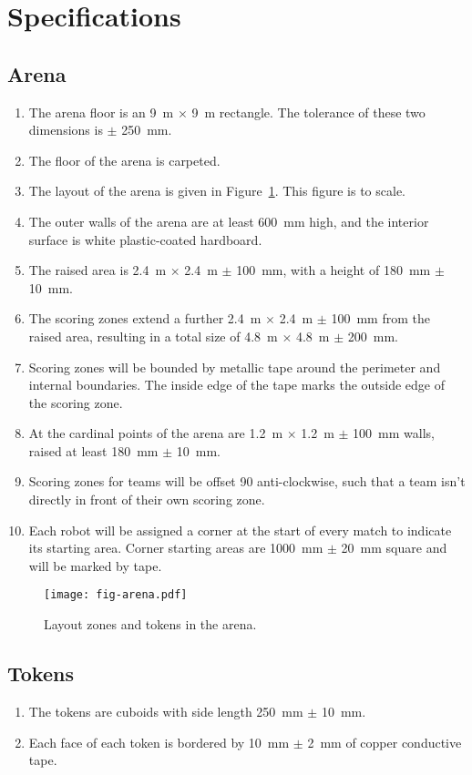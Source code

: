 \section{Specifications}
\label{sec:specs}

\subsection{Arena}
\label{spec:arena}

\begin{enumerate}
  \item The arena floor is an \SI{9}{m} $\times$ \SI{9}{m} rectangle. The
        tolerance of these two dimensions is $\pm$ \SI{250}{mm}.
  \item The floor of the arena is carpeted.
  \item The layout of the arena is given in Figure~\ref{fig:arena}. This
        figure is to scale.
  \item The outer walls of the arena are at least \SI{600}{mm} high, and the
        interior surface is white plastic-coated hardboard.
  \item The raised area is \SI{2.4}{m} $\times$ \SI{2.4}{m} $\pm$ \SI{100}{mm},
        with a height of \SI{180}{mm} $\pm$ \SI{10}{mm}.
  \item The scoring zones extend a further \SI{2.4}{m} $\times$ \SI{2.4}{m} $\pm$ \SI{100}{mm}
        from the raised area, resulting in a total size of \SI{4.8}{m} $\times$ \SI{4.8}{m} $\pm$ \SI{200}{mm}.
  \item Scoring zones will be bounded by metallic tape around the perimeter
        and internal boundaries. The inside edge of the tape marks the outside
        edge of the scoring zone.
  \item At the cardinal points of the arena are \SI{1.2}{m} $\times$ \SI{1.2}{m} $\pm$ \SI{100}{mm} walls,
        raised at least \SI{180}{mm} $\pm$ \SI{10}{mm}.
  \item Scoring zones for teams will be offset 90\degree{} anti-clockwise, such
        that a team isn't directly in front of their own scoring zone.
  \item Each robot will be assigned a corner at the start of every match to indicate its starting area.
        Corner starting areas are \SI{1000}{mm} $\pm$ \SI{20}{mm} square and will be marked by tape.
\end{enumerate}

\begin{figure}
  \texttt{[image: fig-arena.pdf]}
  \caption{Layout zones and tokens in the arena.}
  \label{fig:arena}
\end{figure}

\subsection{Tokens}
\label{spec:tokens}

\begin{enumerate}
  \item The tokens are cuboids with side length \SI{250}{mm} $\pm$ \SI{10}{mm}.
  \item Each face of each token is bordered by \SI{10}{mm} $\pm$ \SI{2}{mm} of
        copper conductive tape.
\end{enumerate}
